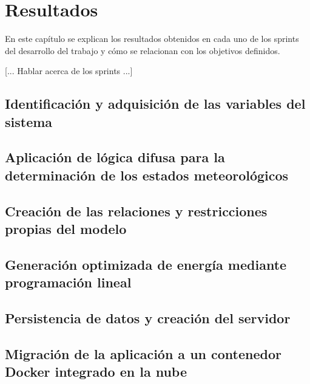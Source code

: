 \chapter{Resultados}
\label{cap:Resultados}
En este capítulo se explican los resultados obtenidos en cada uno de los sprints del desarrollo del trabajo y cómo se relacionan con los objetivos definidos.

[... Hablar acerca de los sprints ...]


\section{Identificación y adquisición de las variables del sistema}

\section{Aplicación de lógica difusa para la determinación de los estados meteorológicos}

\section{Creación de las relaciones y restricciones propias del modelo}

\section{Generación optimizada de energía mediante programación lineal}

\section{Persistencia de datos y creación del servidor}

\section{Migración de la aplicación a un contenedor Docker integrado en la nube}
